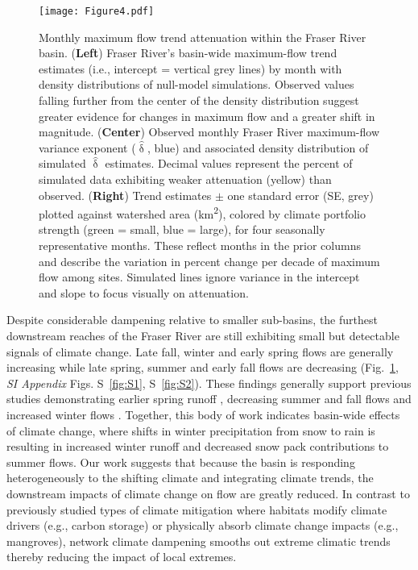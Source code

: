 \documentclass[9pt,twocolumn,twoside,lineno]{pnas-new}
\begin{document}
\begin{figure}%
\centering
\texttt{[image: Figure4.pdf]}
	\caption{Monthly maximum flow trend attenuation within the Fraser River basin. (\textbf{Left}) Fraser River's basin-wide maximum-flow trend estimates (i.e., intercept = vertical grey lines) by month with density distributions of null-model simulations. Observed values falling further from the center of the density distribution suggest greater evidence for changes in maximum flow and a greater shift in magnitude. (\textbf{Center}) Observed monthly Fraser River maximum-flow variance exponent ($\hat{\updelta}$, blue) and associated density distribution of simulated $\hat{\updelta}$ estimates. Decimal values represent the percent of simulated data exhibiting weaker attenuation (yellow) than observed. (\textbf{Right}) Trend estimates $\pm$ one standard error (SE, grey) plotted against watershed area (km\textsuperscript{2}), colored by climate portfolio strength (green = small, blue = large), for four seasonally representative months. These reflect months in the prior columns and describe the variation in percent change per decade of maximum flow among sites. Simulated lines ignore variance in the intercept and slope to focus visually on attenuation.}
\label{fig:4}
\end{figure}

Despite considerable dampening relative to smaller sub-basins, the furthest downstream reaches of the Fraser River are still exhibiting small but detectable signals of climate change. Late fall, winter and early spring flows are generally increasing while late spring, summer and early fall flows are decreasing (Fig.~\ref{fig:4}, \textit{SI Appendix} Figs. S~\ref{fig:S1}, S~\ref{fig:S2}). These findings generally support previous studies demonstrating earlier spring runoff \citep{Dery:2012}, decreasing summer and fall flows \citep{Stahl:2006} and increased winter flows \citep{Healey:2011}. Together, this body of work indicates basin-wide effects of climate change, where shifts in winter precipitation from snow to rain is resulting in increased winter runoff and decreased snow pack contributions to summer flows. Our work suggests that because the basin is responding heterogeneously to the shifting climate and integrating climate trends, the downstream impacts of climate change on flow are greatly reduced. In contrast to previously studied types of climate mitigation where habitats modify climate drivers (e.g., carbon storage) or physically absorb climate change impacts (e.g., mangroves), network climate dampening smooths out extreme climatic trends thereby reducing the impact of local extremes.
\end{document}
